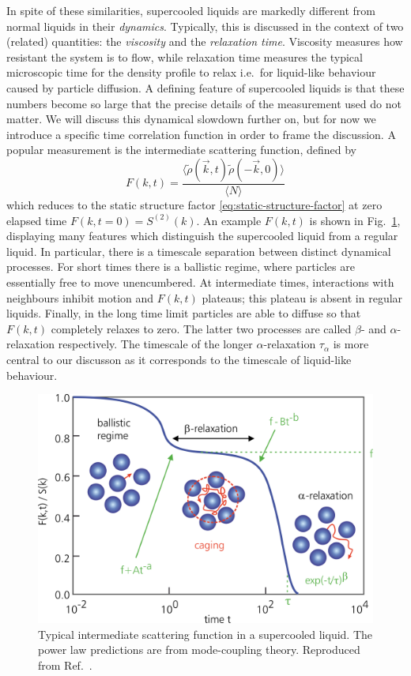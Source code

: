 \documentclass[11pt,twoside]{report}
\begin{document}
In spite of these similarities, supercooled liquids are markedly different from normal liquids in their \emph{dynamics}.
Typically, this is discussed in the context of two (related) quantities: the \emph{viscosity} and the \emph{relaxation time}.
Viscosity measures how resistant the system is to flow, while relaxation time measures the typical microscopic time for the density profile to relax i.e.\ for liquid-like behaviour caused by particle diffusion.
A defining feature of supercooled liquids is that these numbers become so large that the precise details of the measurement used do not matter.
We will discuss this dynamical slowdown further on, but for now we introduce a specific time correlation function in order to frame the discussion.
A popular measurement is the intermediate scattering function, defined by \cite{JanssenFP2018}
\begin{equation}\label{eq:isf}
  F(k, t)
  =
  \frac{
    \big\langle \tilde{\rho}(\vec{k}, t) \tilde{\rho}(-\vec{k}, 0) \big\rangle
  }{
    \langle N \rangle
  }
\end{equation}
which reduces to the static structure factor \eqref{eq:static-structure-factor} at zero elapsed time $F(k, t=0) = S^{(2)}(k)$.
An example $F(k,t)$ is shown in Fig.\ \ref{fig:isf}, displaying many features which distinguish the supercooled liquid from a regular liquid.
In particular, there is a timescale separation between distinct dynamical processes.
For short times there is a ballistic regime, where particles are essentially free to move unencumbered.
At intermediate times, interactions with neighbours inhibit motion and $F(k,t)$ plateaus; this plateau is absent in regular liquids.
Finally, in the long time limit particles are able to diffuse so that $F(k,t)$ completely relaxes to zero.
The latter two processes are called $\beta$- and $\alpha$-relaxation respectively.
The timescale of the longer $\alpha$-relaxation $\tau_\alpha$ is more central to our discusson as it corresponds to the timescale of liquid-like behaviour.

\begin{figure}
  \includegraphics[width=0.9\linewidth,outer]{isf}
  \caption[Intermediate scattering function in a supercooled liquid]{
    Typical intermediate scattering function in a supercooled liquid.
    The power law predictions are from mode-coupling theory.
    Reproduced from Ref.\ \cite{JanssenFP2018}.
  }
  \label{fig:isf}
\end{figure}
\end{document}
